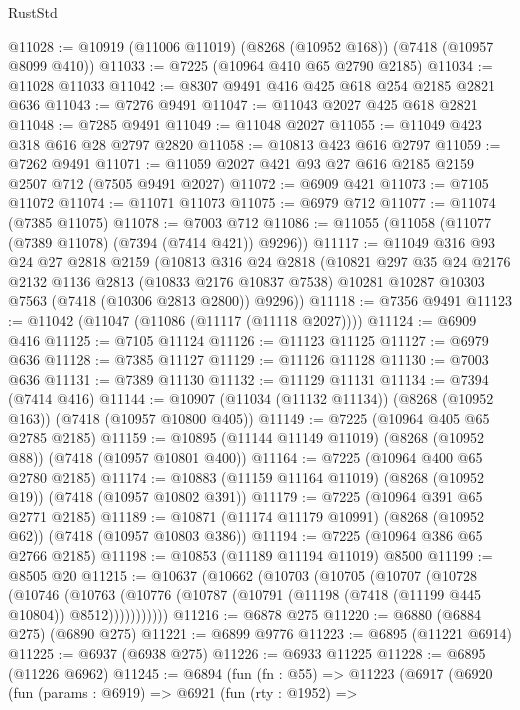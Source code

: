 \begin{lexlean}{RustStd}
\begin{coremodule}
@11028 := @10919 (@11006 @11019) (@8268 (@10952 @168)) (@7418 (@10957 @8099 @410))
@11033 := @7225 (@10964 @410 @65 @2790 @2185)
@11034 := @11028 @11033
@11042 := @8307 @9491 @416 @425 @618 @254 @2185 @2821 @636
@11043 := @7276 @9491
@11047 := @11043 @2027 @425 @618 @2821
@11048 := @7285 @9491
@11049 := @11048 @2027
@11055 := @11049 @423 @318 @616 @28 @2797 @2820
@11058 := @10813 @423 @616 @2797
@11059 := @7262 @9491
@11071 := @11059 @2027 @421 @93 @27 @616 @2185 @2159 @2507 @712 (@7505 @9491 @2027)
@11072 := @6909 @421
@11073 := @7105 @11072
@11074 := @11071 @11073
@11075 := @6979 @712
@11077 := @11074 (@7385 @11075)
@11078 := @7003 @712
@11086 := @11055 (@11058 (@11077 (@7389 @11078) (@7394 (@7414 @421)) @9296))
@11117 := @11049
    @316
    @93
    @24
    @27
    @2818
    @2159
    (@10813
      @316
      @24
      @2818
      (@10821
        @297
        @35
        @24
        @2176
        @2132
        @1136
        @2813
        (@10833 @2176 @10837 @7538)
        @10281
        @10287
        @10303
        @7563
        (@7418 (@10306 @2813 @2800))
        @9296))
@11118 := @7356 @9491
@11123 := @11042 (@11047 (@11086 (@11117 (@11118 @2027))))
@11124 := @6909 @416
@11125 := @7105 @11124
@11126 := @11123 @11125
@11127 := @6979 @636
@11128 := @7385 @11127
@11129 := @11126 @11128
@11130 := @7003 @636
@11131 := @7389 @11130
@11132 := @11129 @11131
@11134 := @7394 (@7414 @416)
@11144 := @10907 (@11034 (@11132 @11134)) (@8268 (@10952 @163)) (@7418 (@10957 @10800 @405))
@11149 := @7225 (@10964 @405 @65 @2785 @2185)
@11159 := @10895 (@11144 @11149 @11019) (@8268 (@10952 @88)) (@7418 (@10957 @10801 @400))
@11164 := @7225 (@10964 @400 @65 @2780 @2185)
@11174 := @10883 (@11159 @11164 @11019) (@8268 (@10952 @19)) (@7418 (@10957 @10802 @391))
@11179 := @7225 (@10964 @391 @65 @2771 @2185)
@11189 := @10871 (@11174 @11179 @10991) (@8268 (@10952 @62)) (@7418 (@10957 @10803 @386))
@11194 := @7225 (@10964 @386 @65 @2766 @2185)
@11198 := @10853 (@11189 @11194 @11019) @8500
@11199 := @8505 @20
@11215 := @10637
    (@10662
      (@10703
        (@10705
          (@10707
            (@10728
              (@10746
                (@10763
                  (@10776 (@10787 (@10791 (@11198 (@7418 (@11199 @445 @10804)) @8512)))))))))))
@11216 := @6878 @275
@11220 := @6880 (@6884 @275) (@6890 @275)
@11221 := @6899 @9776
@11223 := @6895 (@11221 @6914)
@11225 := @6937 (@6938 @275)
@11226 := @6933 @11225
@11228 := @6895 (@11226 @6962)
@11245 := @6894
    (fun (fn : @55) =>
    @11223
      (@6917
        (@6920
          (fun (params : @6919) =>
          @6921
            (fun (rty : @1952) =>

\end{coremodule}
\end{lexlean}
